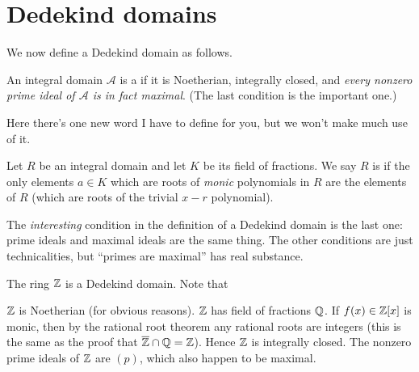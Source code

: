 \section{Dedekind domains}
We now define a Dedekind domain as follows.
\begin{definition}
	An integral domain $\mathcal A$ is a 
	if it is Noetherian, integrally closed, and 
	\emph{every nonzero prime ideal of $\mathcal A$ is in fact maximal}.
	(The last condition is the important one.)
\end{definition}
Here there's one new word I have to define for you, but we won't make much use of it.
\begin{definition}
	Let $R$ be an integral domain and let $K$ be its field of fractions. 
	We say $R$ is  if
	the only elements $a \in K$ which are roots of \emph{monic} polynomials in $R$
	are the elements of $R$ (which are roots of the trivial $x-r$ polynomial).
\end{definition}
The \emph{interesting} condition in the definition
of a Dedekind domain is the last one: prime ideals and maximal ideals
are the same thing.
The other conditions are just technicalities,
but ``primes are maximal'' has real substance.
\begin{example}
	The ring $\mathbb Z$ is a Dedekind domain.
	Note that
	\begin{itemize}
		\ii $\mathbb Z$ is Noetherian (for obvious reasons).
		\ii $\mathbb Z$ has field of fractions $\mathbb Q$.
		If $f(x) \in \mathbb Z[x]$ is monic, then by the rational root theorem
		any rational roots are integers
		(this is the same as the proof that $\overline{\mathbb Z} \cap \mathbb Q = \mathbb Z$).
		Hence $\mathbb Z$ is integrally closed.
		\ii The nonzero prime ideals of $\mathbb Z$ are $(p)$,
		which also happen to be maximal.
	\end{itemize}
\end{example}

